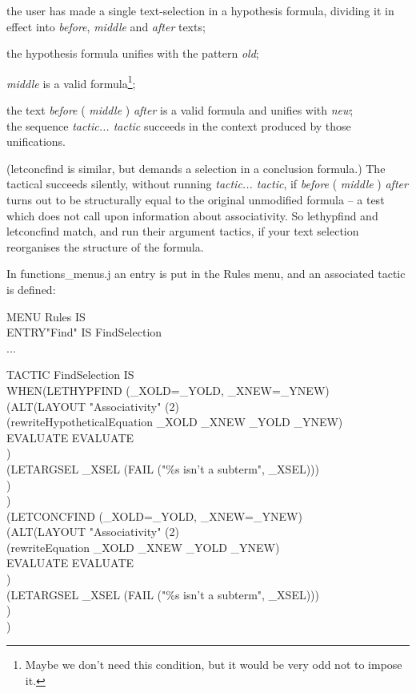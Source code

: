 \documentclass[11pt]{book}
\newcommand{\tab}{\hspace{5mm}}
\begin{document}
{\textbullet}\tab the user has made a single text-selection in a hypothesis formula, dividing it in effect into \textit{before}, \textit{middle} and \textit{after} texts;


{\textbullet}\tab the hypothesis formula unifies with the pattern \textit{old};


{\textbullet}\tab \textit{middle} is a valid formula\footnote{Maybe we don't need this condition, but it would be very odd not to impose it.};


{\textbullet}\tab the text \textit{before} ( \textit{middle} ) \textit{after} is a valid formula and unifies with \textit{new};\\
{\textbullet}\tab the sequence \textit{tactic... tactic} succeeds in the context produced by those unifications.


(letconcfind is similar, but demands a selection in a conclusion formula.) The tactical succeeds silently, without running \textit{tactic... tactic}, if \textit{before} ( \textit{middle} ) \textit{after} turns out to be structurally equal to the original unmodified formula -- a test which does not call upon information about associativity. So lethypfind and letconcfind match, and run their argument tactics, if your text selection reorganises the structure of the formula.


In functions\_menus.j an entry is put in the Rules menu, and an associated tactic is defined:

MENU Rules IS\\
\tab ENTRY\tab "Find" \tab IS FindSelection\\
\tab ...

TACTIC FindSelection IS\\
\tab WHEN\tab (LETHYPFIND (\_XOLD=\_YOLD, \_XNEW=\_YNEW)\\
\tab \tab \tab (ALT\tab (LAYOUT "Associativity" (2)\\
\tab \tab \tab \tab \tab (rewriteHypotheticalEquation \_XOLD \_XNEW \_YOLD \_YNEW) \\
\tab \tab \tab \tab \tab EVALUATE EVALUATE\\
\tab \tab \tab \tab )\\
\tab \tab \tab \tab (LETARGSEL \_XSEL (FAIL ("\%s isn't a subterm", \_XSEL)))\\
\tab \tab \tab )\\
\tab \tab )\\
\tab \tab (LETCONCFIND (\_XOLD=\_YOLD, \_XNEW=\_YNEW)\\
\tab \tab \tab (ALT\tab (LAYOUT "Associativity" (2)\\
\tab \tab \tab \tab \tab (rewriteEquation \_XOLD \_XNEW \_YOLD \_YNEW) \\
\tab \tab \tab \tab \tab EVALUATE EVALUATE\\
\tab \tab \tab \tab )\\
\tab \tab \tab \tab (LETARGSEL \_XSEL (FAIL ("\%s isn't a subterm", \_XSEL)))\\
\tab \tab \tab )\\
\tab \tab )
\end{document}
